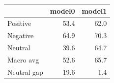 \begin{tabular}{lrr}
\toprule
{} &  model0 &  model1 \\
\midrule
Positive    &    53.4 &    62.0 \\
Negative    &    64.9 &    70.3 \\
Neutral     &    39.6 &    64.7 \\
Macro avg   &    52.6 &    65.7 \\
Neutral gap &    19.6 &     1.4 \\
\bottomrule
\end{tabular}
